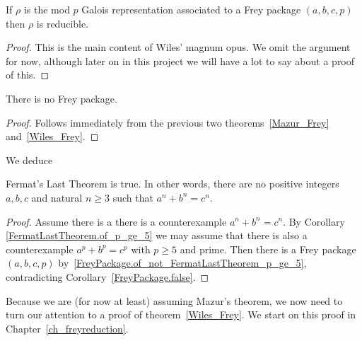 \begin{theorem}
  \label{Wiles_Frey}
  \leanok
  If $\rho$ is the mod $p$ Galois representation associated to a Frey package $(a,b,c,p)$ then
  $\rho$ is reducible.
\end{theorem}
\begin{proof}
  This is the main content of Wiles' magnum opus.
  We omit the argument for now, although later on in this project
  we will have a lot to say about a proof of this.
\end{proof}

\begin{corollary}
  \label{FreyPackage.false}
  \leanok
  There is no Frey package.
\end{corollary}
\begin{proof} Follows immediately from the previous two
  theorems~\ref{Mazur_Frey} and~\ref{Wiles_Frey}.
\end{proof}

We deduce

\begin{corollary}
  \label{FLT}
  \leanok
  Fermat's Last Theorem is true. In other words, there are no positive integers $a,b,c$ and
  natural $n\geq3$ such that $a^n+b^n=c^n$.
\end{corollary}
\begin{proof}
  Assume there is a there is a counterexample $a^n+b^n=c^n$.
  By Corollary \ref{FermatLastTheorem.of_p_ge_5} we may assume that there is also a counterexample
  $a^p+b^p=c^p$ with $p\geq 5$ and prime.
  Then there is a Frey package $(a,b,c,p)$ by~\ref{FreyPackage.of_not_FermatLastTheorem_p_ge_5},
  contradicting Corollary~\ref{FreyPackage.false}.
\end{proof}

Because we are (for now at least) assuming Mazur's theorem, we now need to turn our attention
to a proof of theorem~\ref{Wiles_Frey}. We start on this proof in Chapter~\ref{ch_freyreduction}.
